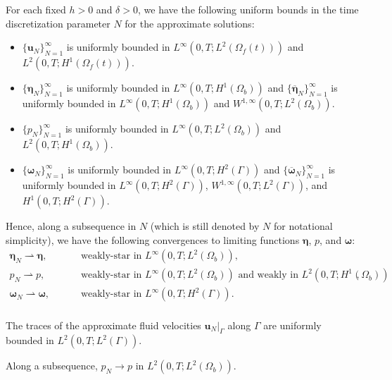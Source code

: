 \documentclass[10pt,a4paper]{amsart}
\newcommand{\bd}{\boldsymbol}
\begin{document}
\begin{proposition}\label{uniformenergy}
For each fixed $h > 0$ and $\delta > 0$, we have the following uniform bounds in the time discretization parameter $N$ for the approximate solutions:
\begin{itemize}
\item $\{\bd{u}_{N}\}_{N = 1}^{\infty}$ is uniformly bounded in $L^{\infty}(0, T; L^{2}(\Omega_{f}(t)))$ and $L^{2}(0, T; H^{1}(\Omega_{f}(t)))$. 
\item $\{\bd{\eta}_{N}\}_{N = 1}^{\infty}$ is uniformly bounded in $L^{\infty}(0, T; H^{1}(\Omega_{b}))$ and $\{\overline{\bd{\eta}}_{N}\}_{N = 1}^{\infty}$ is uniformly bounded in $L^{\infty}(0, T; H^{1}(\Omega_{b}))$ and $W^{1, \infty}(0, T; L^{2}(\Omega_{b}))$. 
\item $\{p_{N}\}_{N = 1}^{\infty}$ is uniformly bounded in $L^{\infty}(0, T; L^{2}(\Omega_{b}))$ and $L^{2}(0, T; H^{1}(\Omega_{b}))$. 
\item $\{\bd{\omega}_{N}\}_{N = 1}^{\infty}$ is uniformly bounded in $L^{\infty}(0, T; H^{2}(\Gamma))$ and $\{\overline{\bd{\omega}}_{N}\}_{N = 1}^{\infty}$ is uniformly bounded in $L^{\infty}(0, T; H^{2}(\Gamma))$, $W^{1, \infty}(0, T; L^{2}(\Gamma))$, and $H^{1}(0, T; H^{2}(\Gamma))$. 
\end{itemize}
Hence, along a subsequence in $N$ (which is still denoted by $N$ for notational simplicity), we have the following convergences to limiting functions $\bd{\eta}$, $p$, and $\bd{\omega}$:
\begin{align*}
\bd{\eta}_{N} \rightharpoonup \bd{\eta}, \qquad &\text{ weakly-star in $L^{\infty}(0, T; L^{2}(\Omega_{b}))$}, \\
p_{N} \rightharpoonup p, \qquad &\text{ weakly-star in $L^{\infty}(0, T; L^{2}(\Omega_{b}))$ and weakly in $L^{2}(0, T; H^{1}(\Omega_{b}))$}, \\
\bd{\omega}_{N} \rightharpoonup \bd{\omega}, \qquad &\text{ weakly-star in $L^{\infty}(0, T; H^{2}(\Gamma))$}. \\
\end{align*}
\end{proposition}

\begin{proposition}\label{traceuniform}
The traces of the approximate fluid velocities $\bd{u}_{N}|_{\Gamma}$ along $\Gamma$ are uniformly bounded in $L^{2}(0, T; L^{2}(\Gamma))$. 
\end{proposition}

\begin{proposition}
Along a subsequence, $p_{N} \to p$ in $L^{2}(0, T; L^{2}(\Omega_{b}))$. 
\end{proposition}
\end{document}
